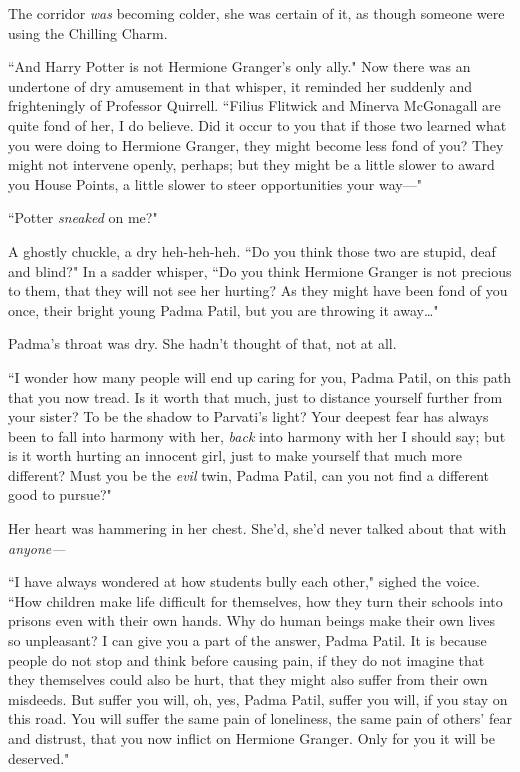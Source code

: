 The corridor \emph{was} becoming colder, she was certain of it, as though someone were using the Chilling Charm.

``And Harry Potter is not Hermione Granger's only ally." Now there was an undertone of dry amusement in that whisper, it reminded her suddenly and frighteningly of Professor Quirrell. ``Filius Flitwick and Minerva McGonagall are quite fond of her, I do believe. Did it occur to you that if those two learned what you were doing to Hermione Granger, they might become less fond of you? They might not intervene openly, perhaps; but they might be a little slower to award you House Points, a little slower to steer opportunities your way---"

``Potter \emph{sneaked} on me?"

A ghostly chuckle, a dry heh-heh-heh. ``Do you think those two are stupid, deaf and blind?" In a sadder whisper, ``Do you think Hermione Granger is not precious to them, that they will not see her hurting? As they might have been fond of you once, their bright young Padma Patil, but you are throwing it away{\ldots}"

Padma's throat was dry. She hadn't thought of that, not at all.

``I wonder how many people will end up caring for you, Padma Patil, on this path that you now tread. Is it worth that much, just to distance yourself further from your sister? To be the shadow to Parvati's light? Your deepest fear has always been to fall into harmony with her, \emph{back} into harmony with her I should say; but is it worth hurting an innocent girl, just to make yourself that much more different? Must you be the \emph{evil} twin, Padma Patil, can you not find a different good to pursue?"

Her heart was hammering in her chest. She'd, she'd never talked about that with \emph{anyone---}

``I have always wondered at how students bully each other," sighed the voice. ``How children make life difficult for themselves, how they turn their schools into prisons even with their own hands. Why do human beings make their own lives so unpleasant? I can give you a part of the answer, Padma Patil. It is because people do not stop and think before causing pain, if they do not imagine that they themselves could also be hurt, that they might also suffer from their own misdeeds. But suffer you will, oh, yes, Padma Patil, suffer you will, if you stay on this road. You will suffer the same pain of loneliness, the same pain of others' fear and distrust, that you now inflict on Hermione Granger. Only for you it will be deserved."

